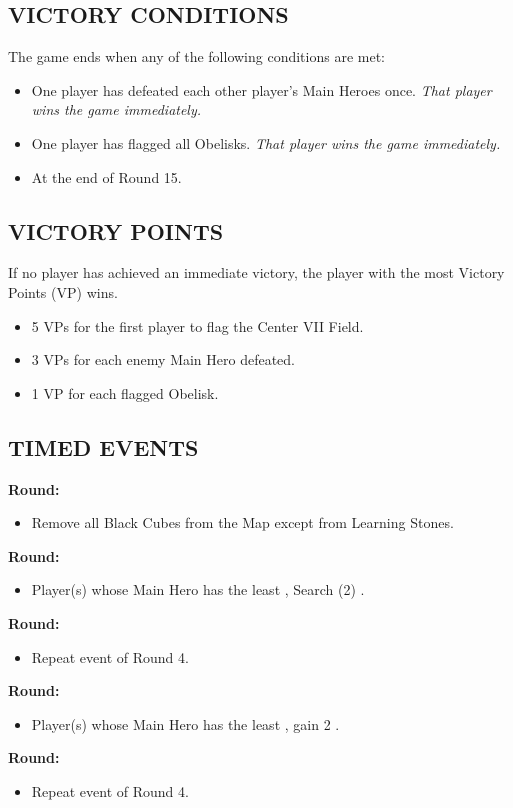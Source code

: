 \begin{multicols}{2}
\subsection*{\MakeUppercase{Victory Conditions}}
The game ends when any of the following conditions are met:

\begin{itemize}
  \item One player has defeated each other player's Main Heroes once. \textit{That player wins the game immediately.}
  \item One player has flagged all Obelisks. \textit{That player wins the game immediately.}
  \item At the end of Round 15.
\end{itemize}

\subsection*{\MakeUppercase{Victory Points}}
If no player has achieved an immediate victory, the player with the most Victory Points (VP) wins.

\begin{itemize}
  \item 5 VPs for the first player to flag the Center VII Field.
  \item 3 VPs for each enemy Main Hero defeated.
  \item 1 VP for each flagged Obelisk.
\end{itemize}

\subsection*{\MakeUppercase{Timed Events}}
\textbf{ Round:}
\begin{itemize}
  \item Remove all Black Cubes from the Map except from Learning Stones.
\end{itemize}
\textbf{ Round:}
\begin{itemize}
  \item Player(s) whose Main Hero has the least , Search (2) .
\end{itemize}
\textbf{ Round:}
\begin{itemize}
  \item Repeat event of Round 4.
\end{itemize}
\textbf{ Round:}
\begin{itemize}
  \item Player(s) whose Main Hero has the least , gain 2 .
\end{itemize}
\textbf{ Round:}
\begin{itemize}
  \item Repeat event of Round 4.
\end{itemize}


\end{multicols}
